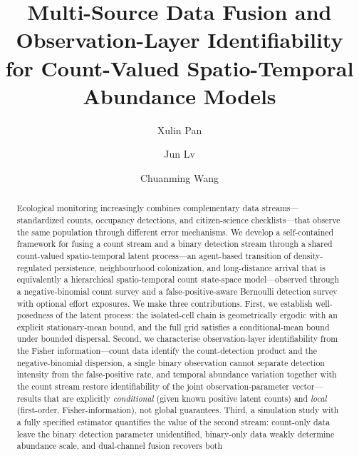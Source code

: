 \documentclass[preprint,12pt]{elsarticle}
\theoremstyle{definition}
\begin{document}
\linenumbers

\begin{frontmatter}

\title{Multi-Source Data Fusion and Observation-Layer Identifiability
       for Count-Valued Spatio-Temporal Abundance Models}

\author[inst1]{Xulin Pan}
\address[inst1]{Pennsylvania State University,
  University Park, PA 16802, USA}

\author[inst2]{Jun Lv}
\address[inst2]{School of Mathematics and Statistics, Yunnan University,
  Kunming 650091, Yunnan, China}

\author[inst3]{Chuanming Wang}
\address[inst2]{School of Biological and Food Engineering, Honghe University,
  Mengzi, Yunnan, China}
  
\begin{abstract}
Ecological monitoring increasingly combines complementary data streams---standardized
counts, occupancy detections, and citizen-science checklists---that observe the same
population through different error mechanisms. We develop a self-contained framework for
fusing a count stream and a binary detection stream through a shared count-valued
spatio-temporal latent process---an agent-based transition of density-regulated
persistence, neighbourhood colonization, and long-distance arrival that is equivalently a
hierarchical spatio-temporal count state-space model---observed through a negative-binomial
count survey and a false-positive-aware Bernoulli detection survey with optional effort
exposures. We make three contributions. First, we establish well-posedness of the latent
process: the isolated-cell chain is geometrically ergodic with an explicit stationary-mean
bound, and the full grid satisfies a conditional-mean bound under bounded dispersal. Second,
we characterise observation-layer identifiability from the Fisher information---count data
identify the count-detection product and the negative-binomial dispersion, a single binary
observation cannot separate detection intensity from the false-positive rate, and temporal
abundance variation together with the count stream restore identifiability of the joint
observation-parameter vector---results that are explicitly \emph{conditional} (given known
positive latent counts) and \emph{local} (first-order, Fisher-information), not global
guarantees. Third, a simulation study with a fully specified estimator quantifies the value
of the second stream: count-only data leave the binary detection parameter unidentified,
binary-only data weakly determine abundance scale, and dual-channel fusion recovers both

\end{abstract}
\end{frontmatter}
\end{document}
